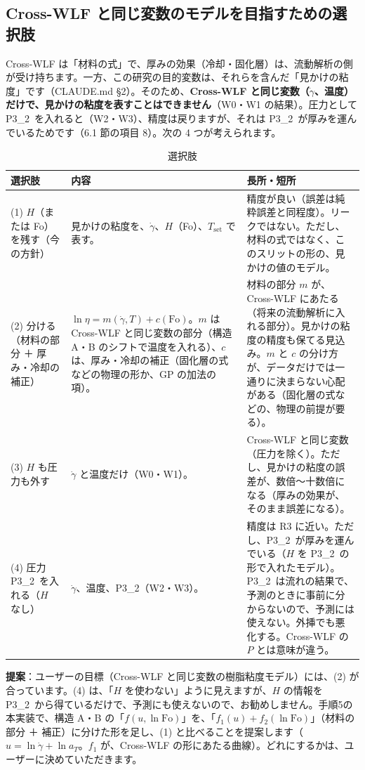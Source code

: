 \documentclass[paper=a4paper,fontsize=10.5pt,line_length=44zw,number_of_lines=38]{jlreq}
\newcommand{\gd}{\dot{\gamma}}
\newcommand{\Tset}{T_{\mathrm{set}}}
\newcommand{\PII}{P3\_2}
\begin{document}
\subsection{Cross-WLF と同じ変数のモデルを目指すための選択肢}
Cross-WLF は「材料の式」で、厚みの効果（冷却・固化層）は、流動解析の側が受け持ちます。一方、この研究の目的変数は、それらを含んだ「見かけの粘度」です（CLAUDE.md §2）。そのため、\textbf{Cross-WLF と同じ変数（$\gd$、温度）だけで、見かけの粘度を表すことはできません}（W0・W1 の結果）。圧力として \PII\ を入れると（W2・W3）、精度は戻りますが、それは \PII\ が厚みを運んでいるためです（6.1 節の項目 8）。次の 4 つが考えられます。

\begin{table}[H]
\caption{選択肢}\label{tab:opt}
\begin{tabularx}{\linewidth}{@{}>{\raggedright\arraybackslash}p{8\zw}>{\raggedright\arraybackslash}X>{\raggedright\arraybackslash}p{12\zw}@{}}
\toprule
選択肢 & 内容 & 長所・短所 \\
\midrule
(1) $H$（または Fo）を残す（今の方針） & 見かけの粘度を、$\gd$、$H$（Fo）、$\Tset$ で表す。 & 精度が良い（誤差は純粋誤差と同程度）。リークではない。ただし、材料の式ではなく、このスリットの形の、見かけの値のモデル。 \\
(2) 分ける（材料の部分 ＋ 厚み・冷却の補正） & $\ln\eta = m(\gd, T) + c(\mathrm{Fo})$。$m$ は Cross-WLF と同じ変数の部分（構造 A・B のシフトで温度を入れる）、$c$ は、厚み・冷却の補正（固化層の式などの物理の形か、GP の加法の項）。 & 材料の部分 $m$ が、Cross-WLF にあたる（将来の流動解析に入れる部分）。見かけの粘度の精度も保てる見込み。$m$ と $c$ の分け方が、データだけでは一通りに決まらない心配がある（固化層の式などの、物理の前提が要る）。 \\
(3) $H$ も圧力も外す & $\gd$ と温度だけ（W0・W1）。 & Cross-WLF と同じ変数（圧力を除く）。ただし、見かけの粘度の誤差が、数倍〜十数倍になる（厚みの効果が、そのまま誤差になる）。 \\
(4) 圧力 \PII\ を入れる（$H$ なし） & $\gd$、温度、\PII（W2・W3）。 & 精度は R3 に近い。ただし、\PII\ が厚みを運んでいる（$H$ を \PII\ の形で入れたモデル）。\PII\ は流れの結果で、予測のときに事前に分からないので、予測には使えない。外挿でも悪化する。Cross-WLF の $P$ とは意味が違う。 \\
\bottomrule
\end{tabularx}
\end{table}

\textbf{提案}：ユーザーの目標（Cross-WLF と同じ変数の樹脂粘度モデル）には、(2) が合っています。(4) は、「$H$ を使わない」ように見えますが、$H$ の情報を \PII\ から得ているだけで、予測にも使えないので、お勧めしません。手順5の本実装で、構造 A・B の「$f(u, \ln\mathrm{Fo})$」を、「$f_1(u) + f_2(\ln\mathrm{Fo})$」（材料の部分 ＋ 補正）に分けた形を足し、(1) と比べることを提案します（$u = \ln\gd + \ln a_T$。$f_1$ が、Cross-WLF の形にあたる曲線）。どれにするかは、ユーザーに決めていただきます。
\end{document}
